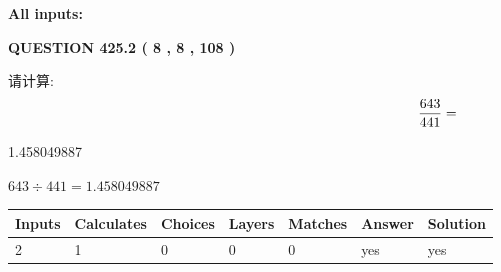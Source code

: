 \documentclass{ctexart}
\begin{document}
   
   
   
\noindent{}
   
   
   
   
\noindent\vspace{0.1in}\hspace{-0.08in} {\textbf{\Large{All inputs: }}}
   
   
  
\vspace{0.2in}
  
{\textbf{\Large{QUESTION
425.2 
 ( 8 , 8 , 108 )
}}}
  
  
 
请计算:
\begin{equation}
\frac { %
643 }  {  %
441} = \nonumber
\end{equation}
 
 
 
\noindent{}
 
 

1.458049887
 
 
\noindent{}
 
 

 
 
 
\noindent{}
 
 

$ %
643 \div  %
441=   %
1.458049887$
 
 
\noindent{}
 
 

 
   
   
   
   
\noindent\begin{tabular}{|l|l|l|l|l|l|l|}
 \hline
Inputs & Calculates & Choices & Layers & Matches & Answer & Solution \\ \hline
 2  & 
 1  & 
 0
  & 
 0  & 
 0  & 
  yes & 
  yes 
  \\ \hline
 \end{tabular}
   
   
   
   
\noindent{}
   
\end{document}
